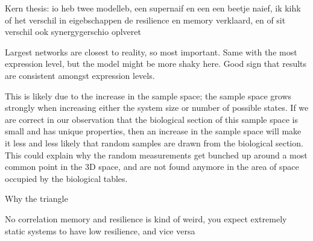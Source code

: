 \documentclass[../main.tex]{subfiles}
\begin{document}
Kern thesis: io heb twee modelleb, een supernaif en een een beetje naief, ik kihk of het verschil in eigebschappen de resilience en memory verklaard, en of sit verschil ook synergygerschio oplveret


Largest networks are closest to reality, so most important.
Same with the most expression level, but the model might be more shaky here.
Good sign that results are consistent amongst expression levels.

This is likely due to the increase in the sample space; the sample space grows strongly when increasing either the system size or number of possible states.
If we are correct in our observation that the biological section of this sample space is small and has unique properties, then an increase in the sample space will make it less and less likely that random samples are drawn from the biological section.
This could explain why the random measurements get bunched up around a most common point in the 3D space, and are not found anymore in the area of space occupied by the biological tables.

Why the triangle

No correlation memory and resilience is kind of weird, you expect extremely static systems to have low resilience, and vice versa
\end{document}
